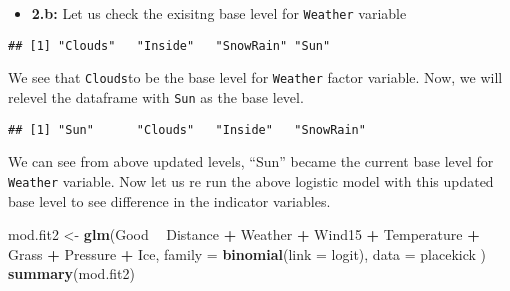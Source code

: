 \documentclass[]{article}
\newenvironment{Shaded}{\begin{snugshade}}{\end{snugshade}}
\newcommand{\CommentTok}[1]{\textcolor[rgb]{0.56,0.35,0.01}{\textit{#1}}}
\newcommand{\DataTypeTok}[1]{\textcolor[rgb]{0.13,0.29,0.53}{#1}}
\newcommand{\KeywordTok}[1]{\textcolor[rgb]{0.13,0.29,0.53}{\textbf{#1}}}
\newcommand{\NormalTok}[1]{#1}
\newcommand{\OperatorTok}[1]{\textcolor[rgb]{0.81,0.36,0.00}{\textbf{#1}}}
\newcommand{\StringTok}[1]{\textcolor[rgb]{0.31,0.60,0.02}{#1}}
\providecommand{\tightlist}{%
  \setlength{\itemsep}{0pt}\setlength{\parskip}{0pt}}
\begin{document}
\begin{itemize}
\tightlist
\item
  \textbf{2.b:} Let us check the exisitng base level for
  \texttt{Weather} variable
\end{itemize}

\begin{Shaded}
\end{Shaded}

\begin{verbatim}
## [1] "Clouds"   "Inside"   "SnowRain" "Sun"
\end{verbatim}

We see that \texttt{Clouds}to be the base level for \texttt{Weather}
factor variable. Now, we will relevel the dataframe with \texttt{Sun} as
the base level.

\begin{Shaded}
\end{Shaded}

\begin{verbatim}
## [1] "Sun"      "Clouds"   "Inside"   "SnowRain"
\end{verbatim}

We can see from above updated levels, ``Sun'' became the current base
level for \texttt{Weather} variable. Now let us re run the above
logistic model with this updated base level to see difference in the
indicator variables.

\begin{Shaded}
\begin{Highlighting}[]
\NormalTok{mod.fit2 <-}\StringTok{ }\KeywordTok{glm}\NormalTok{(Good }\OperatorTok{~}\StringTok{ }\NormalTok{Distance }\OperatorTok{+}\StringTok{ }\NormalTok{Weather }\OperatorTok{+}\StringTok{ }\NormalTok{Wind15 }\OperatorTok{+}\StringTok{ }\NormalTok{Temperature }\OperatorTok{+}\StringTok{ }\NormalTok{Grass }\OperatorTok{+}\StringTok{ }\NormalTok{Pressure }\OperatorTok{+}\StringTok{ }\NormalTok{Ice, }\DataTypeTok{family =} \KeywordTok{binomial}\NormalTok{(}\DataTypeTok{link =}\NormalTok{ logit), }\DataTypeTok{data =}\NormalTok{ placekick )}
\KeywordTok{summary}\NormalTok{(mod.fit2)}
\end{Highlighting}
\end{Shaded}
\end{document}
